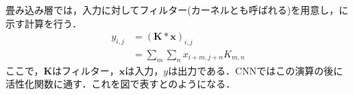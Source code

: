 
畳み込み層では，入力に対してフィルター(カーネルとも呼ばれる)を用意し，に示す計算を行う．
\begin{align}\label{eq:conv}
	y_{i,j} & = (\bm{K} * \bm{x})_{i,j}\\
	& = \sum_m\sum_n x_{i+m, j+n} K_{m,n}
\end{align}
ここで，$\bm{K}$はフィルター，$\bm{x}$は入力，$y$は出力である．CNNではこの演算の後に活性化関数に通す．これを図で表すとのようになる．

